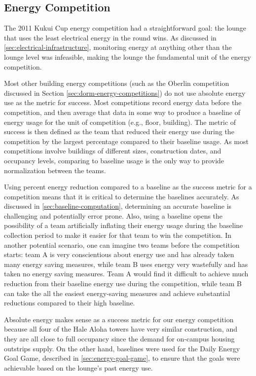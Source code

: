 \subsection{Energy Competition}
\label{sec:energy-competition}

The 2011 Kukui Cup energy competition had a straightforward goal: the lounge that uses the least electrical energy in the round wins. As discussed in \autoref{sec:electrical-infrastructure}, monitoring energy at anything other than the lounge level was infeasible, making the lounge the fundamental unit of the energy competition.

Most other building energy competitions (such as the Oberlin competition discussed in Section \ref{sec:dorm-energy-competitions}) do not use absolute energy use as the metric for success. Most competitions record energy data before the competition, and then average that data in some way to produce a baseline of energy usage for the unit of competition (e.g., floor, building). The metric of success is then defined as the team that reduced their energy use during the competition by the largest percentage compared to their baseline usage. As most competitions involve buildings of different sizes, construction dates, and occupancy levels, comparing to baseline usage is the only way to provide normalization between the teams.

Using percent energy reduction compared to a baseline as the success metric for a competition means that it is critical to determine the baselines accurately. As discussed in \autoref{sec:baseline-computation}, determining an accurate baseline is challenging and potentially error prone. Also, using a baseline opens the possibility of a team artificially inflating their energy usage during the baseline collection period to make it easier for that team to win the competition. In another potential scenario, one can imagine two teams before the competition starts: team A is very conscientious about energy use and has already taken many energy saving measures, while team B uses energy very wastefully and has taken no energy saving measures. Team A would find it difficult to achieve much reduction from their baseline energy use during the competition, while team B can take the all the easiest energy-saving measures and achieve substantial reductions compared to their high baseline.

Absolute energy makes sense as a success metric for our energy competition because all four of the Hale Aloha towers have very similar construction, and they are all close to full occupancy since the demand for on-campus housing outstrips supply. On the other hand, baselines were used for the Daily Energy Goal Game, described in \autoref{sec:energy-goal-game}, to ensure that the goals were achievable based on the lounge's past energy use.

